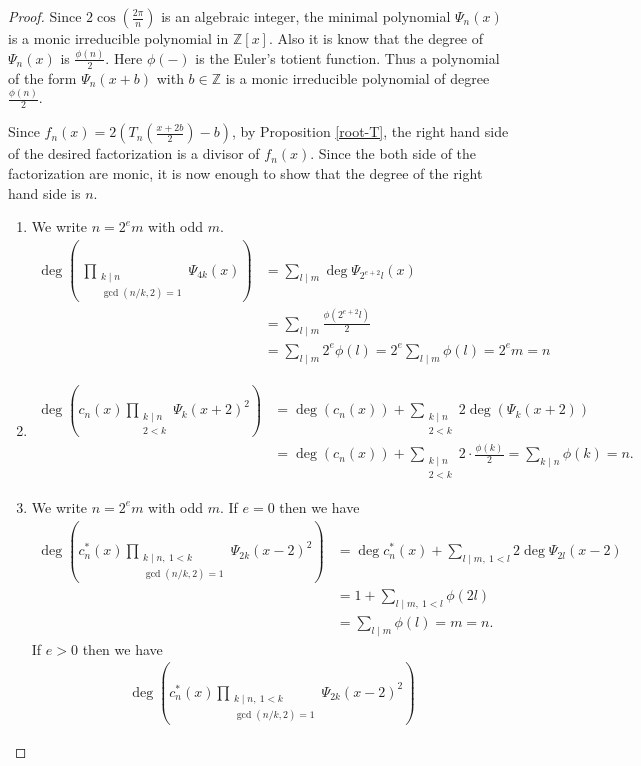 \documentclass[a4paper, 11pt]{amsart}
\numberwithin{equation}{section}
\theoremstyle{definition}
\newcommand{\Z}{\mathbb{Z}}
\begin{document}
\begin{proof}
Since $2\cos(\frac{2\pi}n)$ is an algebraic integer, the minimal polynomial $\Psi_n(x)$ is a monic irreducible polynomial in $\Z[x]$.
Also it is know that the degree of $\Psi_n(x)$ is $\frac{\phi(n)}2$.
Here $\phi(-)$ is the Euler's totient function.
Thus a polynomial of the form $\Psi_n(x+b)$ with $b\in \Z$ is a monic irreducible polynomial of degree $\frac{\phi(n)}2$.

Since $f_n(x)=2(T_n(\frac{x+2b}2)-b)$, by Proposition \ref{root-T}, the right hand side of the desired factorization is a divisor of $f_n(x)$.
Since the both side of the factorization are monic, it is now enough to show that the degree of the right hand side is $n$.
\begin{enumerate}
\item
We write $n=2^em$ with odd $m$. 
\begin{align*}
\deg \left(\ \prod_{\substack{k \mid n \\ \gcd(n/k, 2) = 1}} \Psi_{4k}(x)\right)
&=\sum_{l \mid m}\deg \Psi_{2^{e+2}l}(x)\\
&=\sum_{l \mid m} \frac{\phi(2^{e+2}l)}2\\
&=\sum_{l \mid m}2^e\phi(l)
=2^e\sum_{l \mid m} \phi(l)=2^e m=n
\end{align*}
\item
\begin{align*}
\deg \left(c_n(x) \prod_{\substack{k \mid n \\ 2 < k}} \Psi_k(x+2)^2 \right)
&= \deg(c_n(x)) + \sum_{\substack{k \mid n \\ 2 < k}}2 \deg(\Psi_k(x+2)) \\
&= \deg(c_n(x)) + \sum_{\substack{k \mid n \\ 2 < k}}2 \cdot \frac{\phi(k)}{2} 
= \sum_{k \mid n}\phi(k) = n. 
\end{align*}
\item
We write $n=2^em$ with odd $m$. 
If $e=0$ then we have
\begin{align*}
\deg \left(c^*_n(x)\prod_{\substack{k \mid n,\ 1<k \\ \gcd(n/k, 2) = 1}} \Psi_{2k}(x-2)^2\right)
&=\deg c^*_n(x)+\sum_{l \mid m,\ 1<l}2\deg \Psi_{2l}(x-2)\\
&=1+\sum_{l \mid m,\ 1<l} \phi(2l)\\
&=\sum_{l \mid m} \phi(l)=m=n.
\end{align*}
If $e>0$ then we have
\begin{align*}
\deg \left(c^*_n(x)\prod_{\substack{k \mid n,\ 1<k \\ \gcd(n/k, 2) = 1}} \Psi_{2k}(x-2)^2\right)

\end{align*}
\end{enumerate}
\end{proof}
\end{document}
